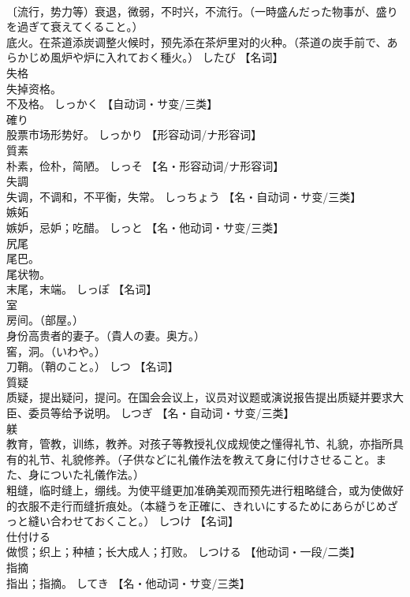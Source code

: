 \documentclass[8pt]{extreport}
\begin{document}
\begin{CJK}{UTF8}{min}
\\	〔流行，势力等）衰退，微弱，不时兴，不流行。（一時盛んだった物事が、盛りを過ぎて衰えてくること。） 
\\	底火。在茶道添炭调整火候时，预先添在茶炉里对的火种。（茶道の炭手前で、あらかじめ風炉や炉に入れておく種火。）	したび		【名词】
\\	失格	
\\	失掉资格。 
\\	不及格。	しっかく		【自动词・サ变/三类】
\\	確り	
\\	股票市场形势好。	しっかり		【形容动词/ナ形容词】
\\	質素	
\\	朴素，俭朴，简陋。	しっそ		【名・形容动词/ナ形容词】
\\	失調	
\\	失调，不调和，不平衡，失常。	しっちょう		【名・自动词・サ变/三类】
\\	嫉妬	
\\	嫉妒，忌妒；吃醋。	しっと		【名・他动词・サ变/三类】
\\	尻尾	
\\	尾巴。 
\\	尾状物。 
\\	末尾，末端。	しっぽ		【名词】
\\	室	
\\	房间。（部屋。） 
\\	身份高贵者的妻子。（貴人の妻。奥方。） 
\\	窖，洞。（いわや。） 
\\	刀鞘。（鞘のこと。）	しつ		【名词】
\\	質疑	
\\	质疑，提出疑问，提问。在国会会议上，议员对议题或演说报告提出质疑并要求大臣、委员等给予说明。	しつぎ		【名・自动词・サ变/三类】
\\	躾	
\\	教育，管教，训练，教养。对孩子等教授礼仪成规使之懂得礼节、礼貌，亦指所具有的礼节、礼貌修养。（子供などに礼儀作法を教えて身に付けさせること。また、身についた礼儀作法。） 
\\	粗缝，临时缝上，绷线。为使平缝更加准确美观而预先进行粗略缝合，或为使做好的衣服不走行而缝折痕处。（本縫うを正確に、きれいにするためにあらがじめざっと縫い合わせておくこと。）	しつけ		【名词】
\\	仕付ける	
\\	做惯；织上；种植；长大成人；打败。	しつける		【他动词・一段/二类】
\\	指摘	
\\	指出；指摘。	してき		【名・他动词・サ变/三类】

\end{CJK}
\end{document}
